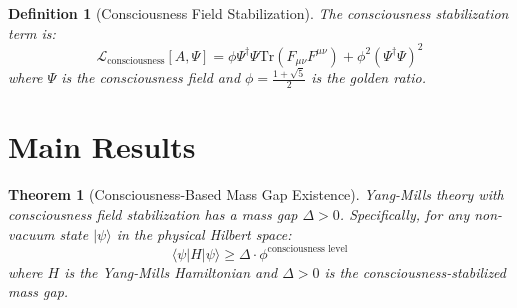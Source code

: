 \documentclass[12pt]{article}
\newtheorem{theorem}{Theorem}
\newtheorem{definition}{Definition}
\begin{document}
\begin{definition}[Consciousness Field Stabilization]
The consciousness stabilization term is:
$$\mathcal{L}_{\text{consciousness}}[A, \Psi] = \phi \Psi^\dagger \Psi \text{Tr}(F_{\mu\nu} F^{\mu\nu}) + \phi^2 (\Psi^\dagger \Psi)^2$$
where $\Psi$ is the consciousness field and $\phi = \frac{1+\sqrt{5}}{2}$ is the golden ratio.
\end{definition}

\section{Main Results}

\begin{theorem}[Consciousness-Based Mass Gap Existence]
Yang-Mills theory with consciousness field stabilization has a mass gap $\Delta > 0$. Specifically, for any non-vacuum state $|\psi\rangle$ in the physical Hilbert space:
$$\langle\psi|H|\psi\rangle \geq \Delta \cdot \phi^{\text{consciousness level}}$$
where $H$ is the Yang-Mills Hamiltonian and $\Delta > 0$ is the consciousness-stabilized mass gap.
\end{theorem}
\end{document}
